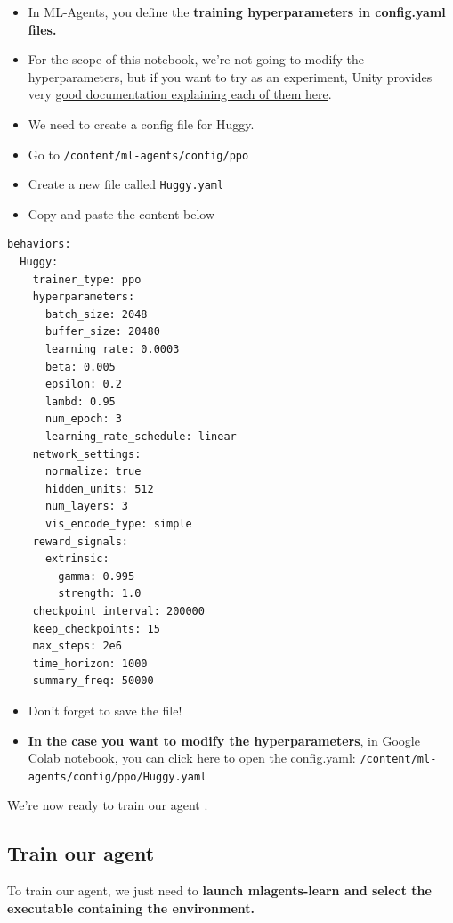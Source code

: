 \documentclass[11pt,a4paper]{article}
\begin{document}
\begin{itemize}
\item
  In ML-Agents, you define the \textbf{training hyperparameters in config.yaml files.}
\item
  For the scope of this notebook, we're not going to modify the hyperparameters, but if you want to try as an experiment, Unity provides very \href{https://github.com/Unity-Technologies/ml-agents/blob/main/docs/Training-Configuration-File.md}{good documentation explaining each of them here}.
\item
  We need to create a config file for Huggy.
\item
  Go to \texttt{/content/ml-agents/config/ppo}
\item
  Create a new file called \texttt{Huggy.yaml}
\item
  Copy and paste the content below
\end{itemize}

\begin{lstlisting}
behaviors:
  Huggy:
    trainer_type: ppo
    hyperparameters:
      batch_size: 2048
      buffer_size: 20480
      learning_rate: 0.0003
      beta: 0.005
      epsilon: 0.2
      lambd: 0.95
      num_epoch: 3
      learning_rate_schedule: linear
    network_settings:
      normalize: true
      hidden_units: 512
      num_layers: 3
      vis_encode_type: simple
    reward_signals:
      extrinsic:
        gamma: 0.995
        strength: 1.0
    checkpoint_interval: 200000
    keep_checkpoints: 15
    max_steps: 2e6
    time_horizon: 1000
    summary_freq: 50000
\end{lstlisting}

\begin{itemize}
\item
  Don't forget to save the file!
\item
  \textbf{In the case you want to modify the hyperparameters}, in Google Colab notebook, you can click here to open the config.yaml: \texttt{/content/ml-agents/config/ppo/Huggy.yaml}
\end{itemize}

We're now ready to train our agent .

\subsection{Train our agent}\label{train-our-agent}

To train our agent, we just need to \textbf{launch mlagents-learn and select the executable containing the environment.}
\end{document}
